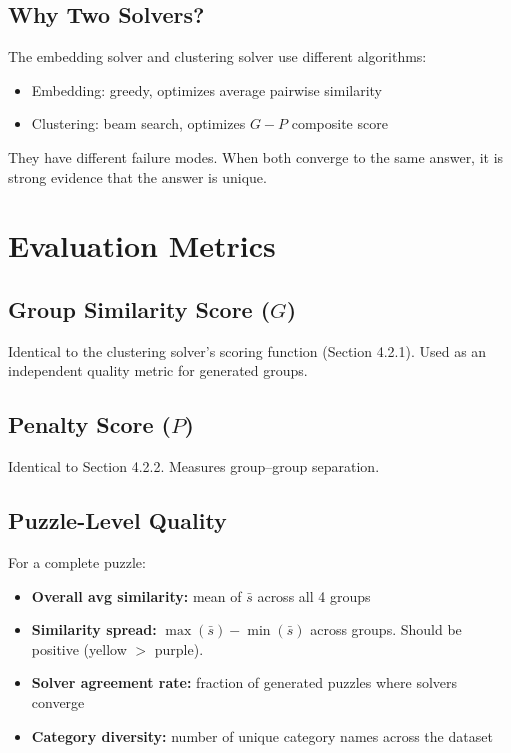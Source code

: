 \documentclass[11pt, letterpaper]{article}
\begin{document}
\subsection{Why Two Solvers?}

The embedding solver and clustering solver use different algorithms:
\begin{itemize}[nosep]
    \item Embedding: greedy, optimizes average pairwise similarity
    \item Clustering: beam search, optimizes $G - P$ composite score
\end{itemize}

They have different failure modes. When both converge to the same answer, it is strong evidence that the answer is unique.

\section{Evaluation Metrics}

\subsection{Group Similarity Score ($G$)}

Identical to the clustering solver's scoring function (Section 4.2.1). Used as an independent quality metric for generated groups.

\subsection{Penalty Score ($P$)}

Identical to Section 4.2.2. Measures group--group separation.

\subsection{Puzzle-Level Quality}

For a complete puzzle:
\begin{itemize}[nosep]
    \item \textbf{Overall avg similarity:} mean of $\bar{s}$ across all 4 groups
    \item \textbf{Similarity spread:} $\max(\bar{s}) - \min(\bar{s})$ across groups. Should be positive (yellow $>$ purple).
    \item \textbf{Solver agreement rate:} fraction of generated puzzles where solvers converge
    \item \textbf{Category diversity:} number of unique category names across the dataset
\end{itemize}
\end{document}
